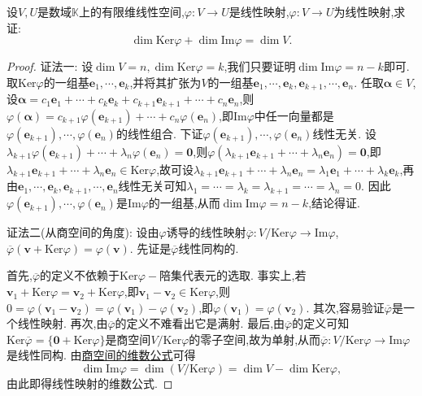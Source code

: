 \documentclass[../../main.tex]{subfiles}%
\begin{document}
\begin{theorem}[线性映射维数公式]\label{theorem:值域和核空间维数之和等于原像空间维数}
设\(V,U\)是数域\(\mathbb{K}\)上的有限维线性空间,\(\varphi:V\to U\)是线性映射,\(\varphi:V\to U\)为线性映射,求证:\[
\dim\text{Ker}\varphi+\dim\text{Im}\varphi=\dim V.
\]
\end{theorem}
\begin{proof}

{\color{blue}证法一:}
设\(\dim V = n,\dim\text{Ker}\varphi = k\),我们只要证明\(\dim\text{Im}\varphi=n - k\)即可. 取\(\text{Ker}\varphi\)的一组基\(\boldsymbol{e}_1,\cdots,\boldsymbol{e}_k\),并将其扩张为\(V\)的一组基\(\boldsymbol{e}_1,\cdots,\boldsymbol{e}_k,\boldsymbol{e}_{k + 1},\cdots,\boldsymbol{e}_n\). 任取\(\boldsymbol{\alpha}\in V\),设\(\boldsymbol{\alpha}=c_1\boldsymbol{e}_1+\cdots + c_k\boldsymbol{e}_k + c_{k + 1}\boldsymbol{e}_{k + 1}+\cdots + c_n\boldsymbol{e}_n\),则\(\varphi(\boldsymbol{\alpha})=c_{k + 1}\varphi(\boldsymbol{e}_{k + 1})+\cdots + c_n\varphi(\boldsymbol{e}_n)\),即\(\text{Im}\varphi\)中任一向量都是\(\varphi(\boldsymbol{e}_{k + 1}),\cdots,\varphi(\boldsymbol{e}_n)\)的线性组合. 下证\(\varphi(\boldsymbol{e}_{k + 1}),\cdots,\varphi(\boldsymbol{e}_n)\)线性无关. 设\(\lambda_{k + 1}\varphi(\boldsymbol{e}_{k + 1})+\cdots + \lambda_n\varphi(\boldsymbol{e}_n)=\boldsymbol{0}\),则\(\varphi(\lambda_{k + 1}\boldsymbol{e}_{k + 1}+\cdots + \lambda_n\boldsymbol{e}_n)=\boldsymbol{0}\),即\(\lambda_{k + 1}\boldsymbol{e}_{k + 1}+\cdots + \lambda_n\boldsymbol{e}_n\in\text{Ker}\varphi\),故可设\(\lambda_{k + 1}\boldsymbol{e}_{k + 1}+\cdots + \lambda_n\boldsymbol{e}_n=\lambda_1\boldsymbol{e}_1+\cdots + \lambda_k\boldsymbol{e}_k\),再由\(\boldsymbol{e}_1,\cdots,\boldsymbol{e}_k,\boldsymbol{e}_{k + 1},\cdots,\boldsymbol{e}_n\)线性无关可知\(\lambda_1=\cdots=\lambda_k=\lambda_{k + 1}=\cdots=\lambda_n = 0\). 因此\(\varphi(\boldsymbol{e}_{k + 1}),\cdots,\varphi(\boldsymbol{e}_n)\)是\(\text{Im}\varphi\)的一组基,从而\(\dim\text{Im}\varphi=n - k\),结论得证. 

{\color{blue}证法二(从商空间的角度):}
设由\(\varphi\)诱导的线性映射\(\overline{\varphi}:V/\text{Ker}\varphi\to\text{Im}\varphi\),\(\overline{\varphi}(\boldsymbol{v}+\text{Ker}\varphi)=\varphi(\boldsymbol{v})\). 先证是$\overline{\varphi}$线性同构的.

首先,\(\overline{\varphi}\)的定义不依赖于\(\text{Ker}\varphi -\)陪集代表元的选取. 事实上,若\(\boldsymbol{v}_1+\text{Ker}\varphi=\boldsymbol{v}_2+\text{Ker}\varphi\),即\(\boldsymbol{v}_1 - \boldsymbol{v}_2\in\text{Ker}\varphi\),则\(0=\varphi(\boldsymbol{v}_1 - \boldsymbol{v}_2)=\varphi(\boldsymbol{v}_1)-\varphi(\boldsymbol{v}_2)\),即\(\varphi(\boldsymbol{v}_1)=\varphi(\boldsymbol{v}_2)\). 其次,容易验证\(\overline{\varphi}\)是一个线性映射. 再次,由\(\overline{\varphi}\)的定义不难看出它是满射. 最后,由\(\overline{\varphi}\)的定义可知\(\text{Ker}\overline{\varphi}=\{\boldsymbol{0}+\text{Ker}\varphi\}\)是商空间\(V/\text{Ker}\varphi\)的零子空间,故为单射,从而\(\overline{\varphi}:V/\text{Ker}\varphi\to\text{Im}\varphi\)是线性同构. 由\hyperref[proposition:商空间的维数公式和商空间与补空间同构]{商空间的维数公式}可得
\[
\dim\text{Im}\varphi=\dim(V/\text{Ker}\varphi)=\dim V-\dim\text{Ker}\varphi,
\]
由此即得线性映射的维数公式.


\end{proof}
\end{document}

